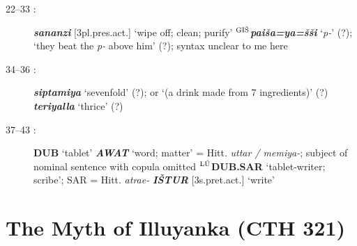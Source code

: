 \documentclass[10pt]{article}
\newcommand{\supersc}[1]{$^{\textrm{\scriptsize{#1}}}$}  	%
\newcommand{\bit}[1]{\textbf{\textit{#1}}}				%
\newcommand{\p}[1]{{\tiny[{#1}]}}					%
\newcommand{\hith}{\textsubwedge{h}}
\newcommand{\man}{\supersc{L\'U}}
\newcommand{\wood}{\supersc{GI\v{S}}}
\renewcommand{\.}[1]{\textsubdot{#1}}
\begin{document}
\begin{description}
\item[22--33 :] \bit{san{\hith}anzi} \p{3pl.pres.act.} `wipe off; clean; purify' \textbf{\wood}\bit{pa{\hith\hith}i\v{s}a=ya=\v{s}\v{s}i} `\textit{p-}' (?); `they beat the \textit{p-} above him' (?); syntax unclear to me here

\item[34--36 :] \bit{siptamiya} `sevenfold' (?); or `(a drink made from 7 ingredients)' (?) \bit{teriyalla} `thrice' (?)

\item[37--43 :] \textbf{DUB} `tablet' \bit{AWAT} `word; matter' = Hitt. \textit{uttar / memiya-}; subject of nominal sentence with copula omitted \textbf{{\man}DUB.SAR} `tablet-writer; scribe'; SAR = Hitt. \textit{{\hith}atrae-} \bit{I\v{S}TUR} \p{3s.pret.act.} `write'


\end{description}


\section{The Myth of Illuyanka (CTH 321)}
\end{document}
